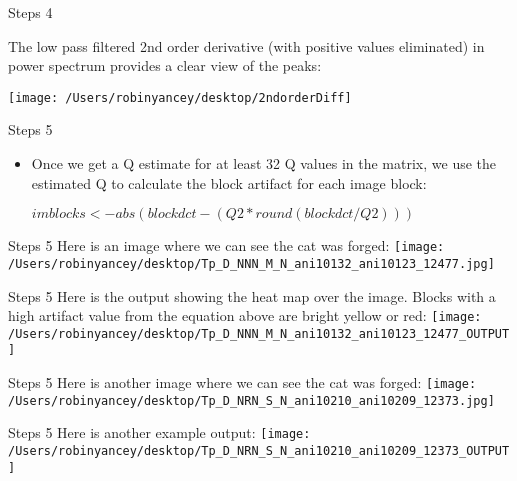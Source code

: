 \documentclass{beamer}
\begin{document}
\begin{frame}{Steps 4}

The low pass filtered 2nd order derivative (with positive values eliminated) in power spectrum provides a clear view of the peaks:

\texttt{[image: /Users/robinyancey/desktop/2ndorderDiff]}
\end{frame}

\begin{frame}{Steps 5}


\begin{itemize}


\item Once we get a Q estimate for at least 32 Q values in the matrix, we use the estimated Q to calculate the block artifact for each image block:

\textbf{\small{$ imblocks <- abs( blockdct - (Q2*round(blockdct/Q2)) ) $}}
\end{itemize}
\end{frame}

\begin{frame}{Steps 5}
Here is an image where we can see the cat was forged:
\texttt{[image: /Users/robinyancey/desktop/Tp\_D\_NNN\_M\_N\_ani10132\_ani10123\_12477.jpg]}
\end{frame}

\begin{frame}{Steps 5}
Here is the output showing the heat map over the image. Blocks with a high artifact value from the equation above are bright yellow or red:
\newline
\texttt{[image: /Users/robinyancey/desktop/Tp\_D\_NNN\_M\_N\_ani10132\_ani10123\_12477\_OUTPUT]}
\end{frame}



\begin{frame}{Steps 5}
Here is another image where we can see the cat was forged:
\texttt{[image: /Users/robinyancey/desktop/Tp\_D\_NRN\_S\_N\_ani10210\_ani10209\_12373.jpg]}
\end{frame}

\begin{frame}{Steps 5}
Here is another example output:
\newline
\texttt{[image: /Users/robinyancey/desktop/Tp\_D\_NRN\_S\_N\_ani10210\_ani10209\_12373\_OUTPUT]}
\end{frame}
\end{document}
